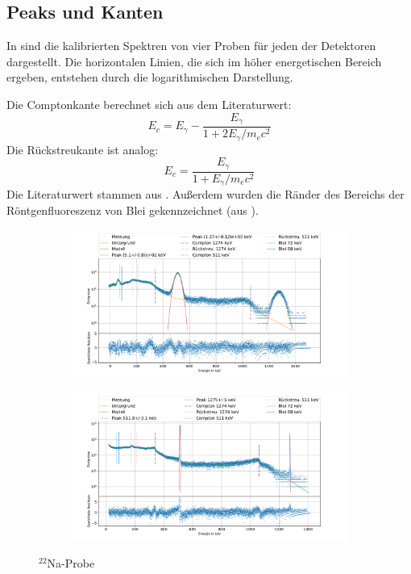 \documentclass[
	a4paper,
	12pt,
	pagesize,
	ngerman
]{scrartcl}
\begin{document}
\subsection{Peaks und Kanten}
In  sind die kalibrierten Spektren von vier Proben für jeden der Detektoren dargestellt.
Die horizontalen Linien, die sich im höher energetischen Bereich ergeben, entstehen durch die logarithmischen Darstellung.

Die Comptonkante berechnet sich aus dem Literaturwert:
\begin{equation}
	E_c = E_\gamma - \frac{E_\gamma }{1+2E_\gamma/m_ec^2}
\end{equation}
Die Rückstreukante ist analog:
\begin{equation}
	E_c =  \frac{E_\gamma}{1+E_\gamma/m_ec^2}
\end{equation}
Die Literaturwert stammen aus \cite{Anleitung}.
Außerdem wurden die Ränder des Bereichs der Röntgenfluoreszenz von Blei gekennzeichnet (aus \cite{XRAYDB}).


\begin{figure}[H]
		\centering
		\begin{subfigure}[c]{\textwidth}
			\centering
			\includegraphics[width= 1 \linewidth]{img/NaNa.pdf}
		\end{subfigure}
		\begin{subfigure}[c]{\textwidth}
			\centering
			\includegraphics[width= 1 \linewidth]{img/NaGe.pdf}
		\end{subfigure}
		\caption{$^{22}$Na-Probe}
		\label{fg_Na}
	\end{figure}
\end{document}
